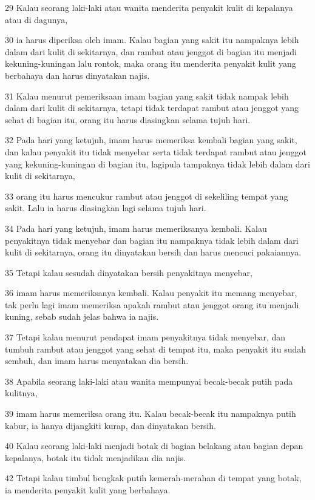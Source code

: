 \par 29 Kalau seorang laki-laki atau wanita menderita penyakit kulit di kepalanya atau di dagunya,
\par 30 ia harus diperiksa oleh imam. Kalau bagian yang sakit itu nampaknya lebih dalam dari kulit di sekitarnya, dan rambut atau jenggot di bagian itu menjadi kekuning-kuningan lalu rontok, maka orang itu menderita penyakit kulit yang berbahaya dan harus dinyatakan najis.
\par 31 Kalau menurut pemeriksaan imam bagian yang sakit tidak nampak lebih dalam dari kulit di sekitarnya, tetapi tidak terdapat rambut atau jenggot yang sehat di bagian itu, orang itu harus diasingkan selama tujuh hari.
\par 32 Pada hari yang ketujuh, imam harus memeriksa kembali bagian yang sakit, dan kalau penyakit itu tidak menyebar serta tidak terdapat rambut atau jenggot yang kekuning-kuningan di bagian itu, lagipula tampaknya tidak lebih dalam dari kulit di sekitarnya,
\par 33 orang itu harus mencukur rambut atau jenggot di sekeliling tempat yang sakit. Lalu ia harus diasingkan lagi selama tujuh hari.
\par 34 Pada hari yang ketujuh, imam harus memeriksanya kembali. Kalau penyakitnya tidak menyebar dan bagian itu nampaknya tidak lebih dalam dari kulit di sekitarnya, orang itu dinyatakan bersih dan harus mencuci pakaiannya.
\par 35 Tetapi kalau sesudah dinyatakan bersih penyakitnya menyebar,
\par 36 imam harus memeriksanya kembali. Kalau penyakit itu memang menyebar, tak perlu lagi imam memeriksa apakah rambut atau jenggot orang itu menjadi kuning, sebab sudah jelas bahwa ia najis.
\par 37 Tetapi kalau menurut pendapat imam penyakitnya tidak menyebar, dan tumbuh rambut atau jenggot yang sehat di tempat itu, maka penyakit itu sudah sembuh, dan imam harus menyatakan dia bersih.
\par 38 Apabila seorang laki-laki atau wanita mempunyai becak-becak putih pada kulitnya,
\par 39 imam harus memeriksa orang itu. Kalau becak-becak itu nampaknya putih kabur, ia hanya dijangkiti kurap, dan dinyatakan bersih.
\par 40 Kalau seorang laki-laki menjadi botak di bagian belakang atau bagian depan kepalanya, botak itu tidak menjadikan dia najis.
\par 42 Tetapi kalau timbul bengkak putih kemerah-merahan di tempat yang botak, ia menderita penyakit kulit yang berbahaya.
